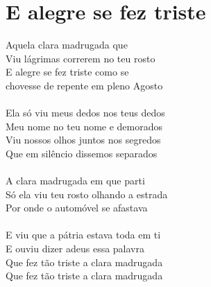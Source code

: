 \documentclass{article}
\begin{document}
\section{ E alegre se fez triste}
Aquela clara madrugada que\\
Viu lágrimas correrem no teu rosto\\
E alegre se fez triste como se\\
chovesse de repente em pleno Agosto\\
\\
Ela só viu meus dedos nos teus dedos\\
Meu nome no teu nome e demorados\\
Viu nossos olhos juntos nos segredos\\
Que em silêncio dissemos separados\\
\\
A clara madrugada em que parti \\
Só ela viu teu rosto olhando a estrada\\
Por onde o automóvel se afastava\\
\\
E viu que a pátria estava toda em ti\\
E ouviu dizer adeus essa palavra\\
Que fez tão triste a clara madrugada\\
Que fez tão triste a clara madrugada\\
\end{document}
